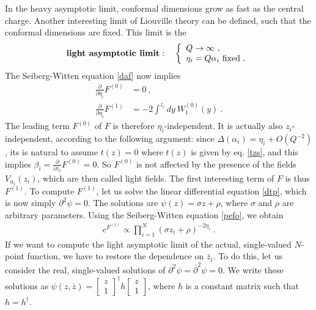\documentclass[12pt, a4paper, notitlepage, twoside]{report}
\numberwithin{equation}{section}
\theoremstyle{break}
\begin{document}
In the heavy asymptotic limit, conformal dimensions grow as fast as the central charge.
Another interesting limit of Liouville theory can be defined, such that the conformal dimensions are fixed.
This limit is the
\begin{align}
 \textbf{\boldmath light\ asymptotic\ limit}\index{light\ asymptotic\ limit}: \quad \left\{\begin{array}{l}  Q \to \infty \ ,\\ \eta_i=Q\alpha_i\ \text{fixed}\ .\end{array}\right.  
\end{align}
 The Seiberg-Witten equation \eqref{daf} now implies 
\begin{align}
 {\frac{\partial}{\partial \eta_i}} F^{(0)} & = 0 \ ,
\\ 
{\frac{\partial}{\partial \eta_i}} F^{(1)} & = -2\int^{z_i} dy\  W_1^{(0)}(y) \ .
\label{pefo}
\end{align}
The leading term $F^{(0)}$ of $F$ is therefore $\eta_i$-independent.
It is actually also $z_i$-independent, according to the following argument: since $\Delta(\alpha_i)=\eta_i + O(Q^{-2})$, its is natural to assume $t(z)=0$ where $t(z)$ is given by eq. \eqref{tzs}, and this implies $\beta_i={\frac{\partial}{\partial z_i}} F^{(0)}=0$.
So $F^{(0)}$ is not affected by the presence of the fields $V_{\alpha_i}(z_i)$, which are then called light fields.
The first interesting term of $F$ is thus $F^{(1)}$.
To compute $F^{(1)}$, let us solve the linear differential equation \eqref{dtp}, which is now simply $\partial^2 \psi=0$.
The solutions are $\psi(z) = \sigma z + \rho$, where $\sigma$ and $\rho$ are arbitrary parameters.
Using the Seiberg-Witten equation \eqref{pefo}, we obtain
\begin{align}
 e^{F^{(1)}} \propto \prod_{i=1}^N (\sigma z_i + \rho)^{-2\eta_i} \ .
\end{align}
If we want to compute the light asymptotic limit of the actual, single-valued $N$-point function, we have to restore the dependence on $\bar{z}_i$.
To do this, let us consider the real, single-valued solutions of $\partial^2 \psi = \bar{\partial}^2\psi=0$.
We write these solutions as $\psi(z,\bar{z}) = \left[\begin{smallmatrix} z \\ 1 \end{smallmatrix}\right]^\dagger h \left[\begin{smallmatrix} z \\ 1 \end{smallmatrix}\right]$, where $h$ is a constant matrix such that $h=h^\dagger$.
\end{document}
